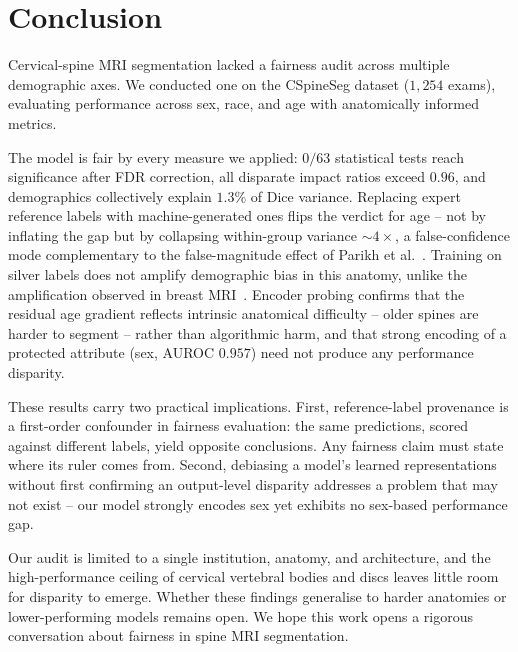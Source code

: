 \section{Conclusion}

Cervical-spine MRI segmentation lacked a fairness audit across multiple
demographic axes. We conducted one on the CSpineSeg dataset ($1{,}254$ exams),
evaluating performance across sex, race, and age with anatomically informed
metrics.

The model is fair by every measure we applied: $0/63$ statistical tests reach
significance after FDR correction, all disparate impact ratios exceed $0.96$, and
demographics collectively explain $1.3\%$ of Dice variance. Replacing expert
reference labels with machine-generated ones flips the verdict for age --
not by inflating the gap but by collapsing within-group variance ${\sim}4\times$,
a false-confidence mode complementary to the false-magnitude effect of Parikh et
al.~\cite{parikh2025labelbias}. Training on silver labels does not amplify
demographic bias in this anatomy, unlike the amplification observed in breast
MRI~\cite{parikh2025labelbias}. Encoder probing confirms that the residual age
gradient reflects intrinsic anatomical difficulty -- older spines are harder to
segment -- rather than algorithmic harm, and that strong encoding of a protected
attribute (sex, AUROC $0.957$) need not produce any performance disparity.

These results carry two practical implications. First, reference-label provenance
is a first-order confounder in fairness evaluation: the same predictions, scored
against different labels, yield opposite conclusions. Any fairness claim must
state where its ruler comes from. Second, debiasing a model's learned
representations without first confirming an output-level disparity addresses a
problem that may not exist -- our model strongly encodes sex yet exhibits no
sex-based performance gap.

Our audit is limited to a single institution, anatomy, and architecture, and the
high-performance ceiling of cervical vertebral bodies and discs leaves little room
for disparity to emerge. Whether these findings generalise to harder anatomies or
lower-performing models remains open. We hope this work opens a rigorous
conversation about fairness in spine MRI segmentation.

